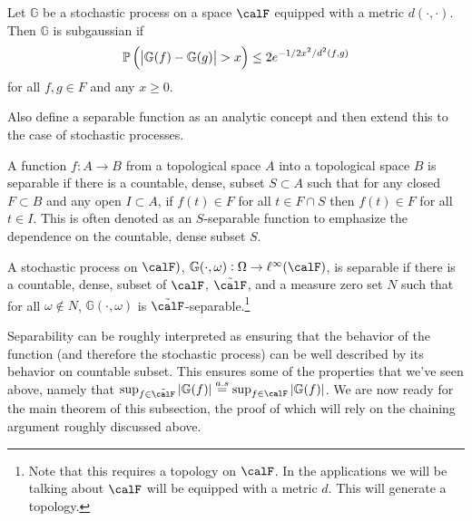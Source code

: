 \begin{definition}
	\label{def:subgaussian}
	Let \(\mathbb{G}\) be a stochastic process on a space \(\calF\) equipped with a metric \(d(\cdot,\cdot)\). Then  \(\mathbb{G}\) is subgaussian if
	\begin{equation}
		\label{eq:subgaussian}
		\P\left(\left|\mathbb{G}(f)-\mathbb{G}(g)\right|> x\right)\leq 2e^{-1/2x^2/d^2(f,g)}
	\end{equation}
	for all \(f,g \in F\) and any  \(x\geq 0\).
\end{definition}

Also define a separable function as an analytic concept and then extend this to the case of stochastic processes.

\begin{definition}
	\label{def:seperable-function}
	A function \(f:A\to B\) from a topological space \(A\) into a topological space  \(B\) is separable if there is a countable, dense, subset  \(S \subset A\) such that  for any closed \(F \subset B\) and any open \(I \subset A\), if  \(f(t) \in F\) for all  \(t \in F \cap S\) then  \(f(t) \in F\) for all  \(t \in I\). This is often denoted as an \(S\)-separable function to emphasize the dependence on the countable, dense subset  \(S\).
\end{definition}

\begin{definition}
	\label{def:seperable-process}
	A stochastic process on \(\calF)\), \(\mathbb{G}(\cdot,\omega):\Omega \to \ell^\infty(\calF)\), is separable if there is a countable, dense, subset of \(\calF\), \(\tilde\calF\), and a measure zero set \(N\) such that for all \(\omega\not\in N\),  \(\mathbb{G}(\cdot,\omega)\) is \(\tilde\calF\)-separable.\footnote{Note that this requires a topology on \(\calF\). In the applications we will be talking about  \(\calF\) will be equipped with a metric  \(d\). This will generate a topology.} 
\end{definition}

Separability can be roughly interpreted as ensuring that the behavior of the function (and therefore the stochastic process) can be well described by its behavior on countable subset. This ensures some of the properties that we've seen above, namely that \(\sup_{f\in\tilde\calF}|\mathbb{G}(f)| \overset{a.s}{=} \sup_{f\in\calF}|\mathbb{G}(f)|\). We are now ready for the main theorem of this subsection, the proof of which will rely on the chaining argument roughly discussed above.

